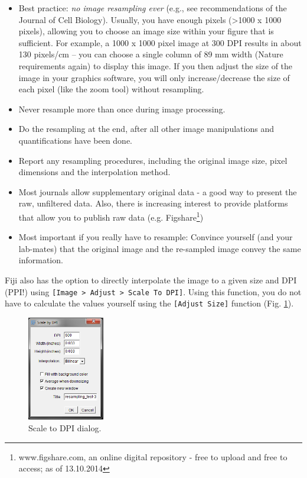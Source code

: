 \begin{itemize}
	\item Best practice: \emph{no image resampling ever} (e.g., see recommendations of the Journal of Cell Biology). Usually, you have enough pixels (>1000 x 1000 pixels), allowing you to choose an image size within your figure that is sufficient. For example, a 1000 x 1000 pixel image at 300 DPI results in about 130 pixels/cm -- you can choose a single column of 89 mm width (Nature requirements again) to display this image. If you then adjust the size of the image in your graphics software, you will only increase/decrease the size of each pixel (like the zoom tool) without resampling.
	\item Never resample more than once during image processing.
	\item Do the resampling at the end, after all other image manipulations and quantifications have been done.	
	\item Report any resampling procedures, including the original image size, pixel dimensions and the interpolation method.
	\item Most journals allow supplementary original data - a good way to present the raw, unfiltered data. Also, there is increasing interest to provide platforms that allow you to publish raw data (e.g. Figshare\footnote{www.figshare.com, an online digital repository - free to upload and free to access; as of 13.10.2014})
	\item Most important if you really have to resample: Convince yourself (and your lab-mates) that the original image and the re-sampled image convey the same information.
\end{itemize}

Fiji also has the option to directly interpolate the image to a given size and DPI (PPI!) using \texttt{[Image > Adjust > Scale To DPI]}. Using this function, you do not have to calculate the values yourself using the \texttt{[Adjust Size]} function (Fig. \ref{fig:scale-to-dpi-dialog}).
\begin{figure}[!h]
	\centering
		\includegraphics[width=0.3\textwidth]{mod1-publishing/figures/scale-to-dpi-dialog.png}
	\caption{Scale to DPI dialog.}
	\label{fig:scale-to-dpi-dialog}
\end{figure}

